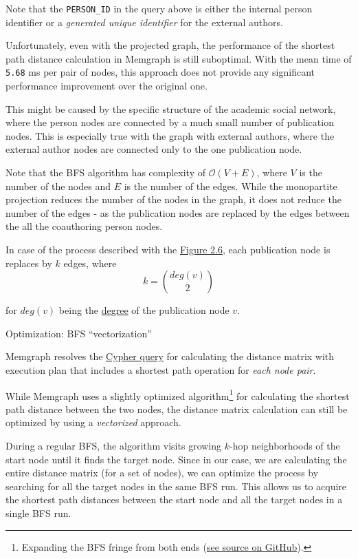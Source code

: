 Note that the \texttt{PERSON\_ID} in the query above is either the internal person identifier or a \textit{generated unique identifier} for the external authors.

Unfortunately, even with the projected graph, the performance of the shortest path distance calculation in Memgraph is still suboptimal. 
With the mean time of \texttt{5.68} ms per pair of nodes, this approach does not provide any significant performance improvement over the original one.

This might be caused by the specific structure of the academic social network, where the person nodes are connected by a much small number of publication nodes.
This is especially true with the graph with external authors, where the external author nodes are connected only to the one publication node.

Note that the BFS algorithm has complexity of $\mathcal{O}(V + E)$, where $V$ is the number of the nodes and $E$ is the number of the edges.
While the monopartite projection reduces the number of the nodes in the graph, it does not reduce the number of the edges - as the publication nodes are replaced 
by the edges between the all the coauthoring person nodes. 

In case of the process described with the \hyperref[fig:monopartite-projection]{Figure 2.6}, each publication node is replaces 
by $k$ edges, where 
$$
k = \binom{deg(v)}{2}
$$

for $deg(v)$ being the \hyperref[def:node-degree]{degree} of the publication node $v$.

\begin{mybox}
    {Optimization: BFS ``vectorization''}

    Memgraph resolves the \hyperref[fig:distance-matrix-calculation]{Cypher query} for calculating the distance matrix
    with execution plan that includes a shortest path operation for \textit{each node pair}.

    While Memgraph uses a slightly optimized algorithm\footnote{Expanding the BFS fringe from both ends (\href{https://github.com/memgraph/memgraph/blob/58c3902c194e80a027d141788bd1afd07def0114/src/query/plan/operator.cpp\#L1569-L1572}{see source on GitHub}).} for calculating the shortest path distance between the two nodes,    
    the distance matrix calculation can still be optimized by using a \textit{vectorized} approach.

    During a regular BFS, the algorithm visits growing $k$-hop neighborhoods of the start node until it finds the target node.
    Since in our case, we are calculating the entire distance matrix (for a set of nodes), 
    we can optimize the process by searching for all the target nodes in the same BFS run.
    This allows us to acquire the shortest path distances between the start node and all 
    the target nodes in a single BFS run.

\end{mybox}

